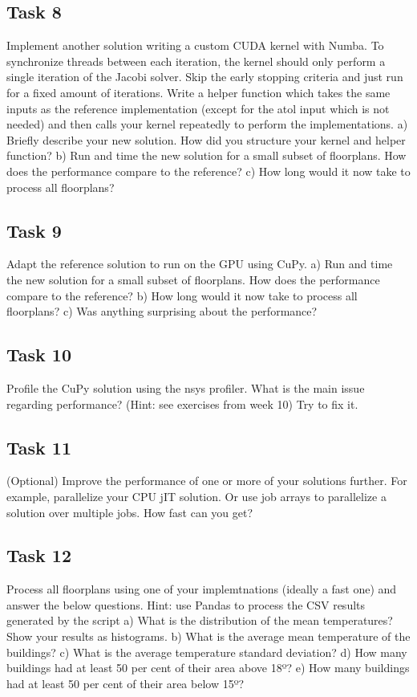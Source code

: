 \documentclass[a4paper,12pt]{article}
\begin{document}
\subsection{Task 8}
Implement another solution writing a custom CUDA kernel with Numba. To synchronize threads between each iteration, the kernel should only perform a single iteration of the Jacobi solver. Skip the early stopping criteria and just run for a fixed amount of iterations. Write a helper function which takes the same inputs as the reference implementation (except for the atol input which is not needed) and then calls your kernel repeatedly to perform the implementations.
a) Briefly describe your new solution. How did you structure your kernel and helper function?
b) Run and time the new solution for a small subset of floorplans. How does the performance compare to the reference?
c) How long would it now take to process all floorplans?

\subsection{Task 9}
Adapt the reference solution to run on the GPU using CuPy.
a) Run and time the new solution for a small subset of floorplans. How does the performance compare to the reference?
b) How long would it now take to process all floorplans?
c) Was anything surprising about the performance?

\subsection{Task 10}
Profile the CuPy solution using the nsys profiler. What is the main issue regarding performance? (Hint: see exercises from week 10) Try to fix it.

\subsection{Task 11}
(Optional) Improve the performance of one or more of your solutions further. For example, parallelize your CPU jIT solution. Or use job arrays to parallelize a solution over multiple jobs. How fast can you get?

\subsection{Task 12}
Process all floorplans using one of your implemtnations (ideally a fast one) and answer the below questions.
Hint: use Pandas to process the CSV results generated by the script
a) What is the distribution of the mean temperatures? Show your results as histograms.
b) What is the average mean temperature of the buildings?
c) What is the average temperature standard deviation?
d) How many buildings had at least 50 per cent of their area above 18º?
e) How many buildings had at least 50 per cent of their area below 15º?
\end{document}
